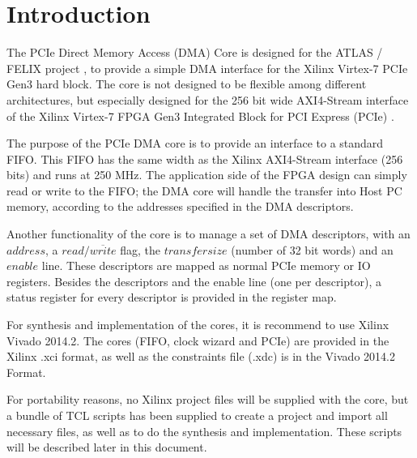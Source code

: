 \section{Introduction}
The PCIe Direct Memory Access (DMA) Core is designed for the ATLAS / FELIX project \cite{atlas}, to provide a simple
DMA interface for the Xilinx  Virtex-7 PCIe Gen3 hard block. The core is not designed to be flexible among different architectures, but especially designed for the 256 bit wide AXI4-Stream interface
\cite{ug761}  of the Xilinx Virtex-7 FPGA Gen3 Integrated Block for PCI Express (PCIe) \cite{xilinxcore}
\cite{pg023}.

The purpose of the PCIe DMA core is to provide an interface to a standard FIFO. This FIFO has the same width as the Xilinx AXI4-Stream interface (256 bits) and runs at 250 MHz. The application side of the FPGA design can simply read or write to the FIFO; the DMA core will handle the transfer into Host PC memory, according to the addresses specified in the DMA descriptors.

Another functionality of the core is to manage a set of DMA descriptors, with an $address$, a $read/\overline{write}$ flag, the $transfer size$ (number of 32 bit words) and an $enable$ line. These descriptors are mapped as normal PCIe memory or IO registers. Besides the descriptors and the enable line (one per descriptor), a status register for every descriptor is provided in the register map.

For synthesis and implementation of the cores, it is recommend to use Xilinx Vivado 2014.2. The cores (FIFO, clock wizard and PCIe) are provided in the Xilinx .xci format, as well as the constraints file (.xdc) is in the Vivado 2014.2 Format.

For portability reasons, no Xilinx project files will be supplied with the core, but a bundle of TCL scripts has been supplied to create a project and import all necessary files, as well as to do the synthesis and implementation. These scripts will be described later in this document.


\newpage
